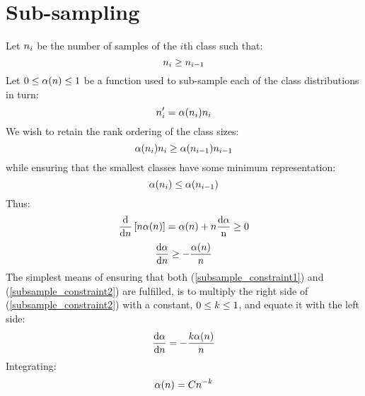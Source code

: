 \section{Sub-sampling}
\label{shuttle_subsampling}

Let $n_i$ be the number of samples of the $i$th class such
that:
\begin{equation}
n_i \ge n_{i-1}
\end{equation}
Let $0 \le \alpha(n) \le 1$ be a function used to sub-sample each of the class
distributions in turn:
\begin{equation}
n_i^\prime = \alpha(n_i) n_i
\end{equation}
We wish to retain the rank ordering of the class sizes:
\begin{equation}
\alpha(n_i) n_i 
\ge \alpha(n_{i-1}) n_{i-1} 
\end{equation}
while ensuring that the smallest classes have some minimum representation:
\begin{equation}
\alpha(n_i) \le \alpha(n_{i-1})
\label{subsample_constraint1}
\end{equation}
Thus:
\begin{equation}
	\frac{\mathrm d}{\mathrm d n} \left [ n \alpha(n) \right ] = \alpha(n) + n \frac{\mathrm d \alpha}{\mathrm n} \ge 0
\end{equation}
\begin{equation}
	\frac{\mathrm d \alpha}{\mathrm d n} \ge - \frac{\alpha(n)}{n}
\label{subsample_constraint2}
\end{equation}
The simplest means of ensuring that both (\ref{subsample_constraint1}) and
(\ref{subsample_constraint2}) are fulfilled, is to multiply the right side
of (\ref{subsample_constraint2}) with a constant, $0 \le k \le 1$,
and equate it with the left side:
\begin{equation}
	\frac{\mathrm d \alpha}{\mathrm d n} = - \frac{k \alpha(n)}{n}
\end{equation}
Integrating:
\begin{equation}
	\alpha(n)=C n^{-k}
\end{equation}

